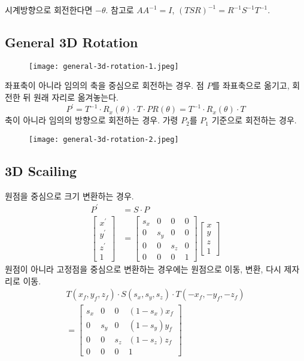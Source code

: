 시계방향으로 회전한다면 $-\theta$. 참고로 $AA^{-1} = I$, $(TSR)^{-1} = R^{-1}S^{-1}T^{-1}$.

\subsection{General 3D Rotation}

\begin{figure}[h]
  \centering
  \texttt{[image: general-3d-rotation-1.jpeg]}
\end{figure}
좌표축이 아니라 임의의 축을 중심으로 회전하는 경우. 점 $P$를 좌표축으로 옮기고, 회전한 뒤 원래 자리로 옮겨놓는다.
$$
P^\prime = T^{-1} \cdot R_x(\theta) \cdot T \cdot P
R(\theta) = T^{-1} \cdot R_x(\theta) \cdot T
$$
축이 아니라 임의의 방향으로 회전하는 경우. 가령 $P_2$를 $P_1$ 기준으로 회전하는 경우.
\begin{figure}[h]
  \centering
  \texttt{[image: general-3d-rotation-2.jpeg]}
\end{figure}

\subsection{3D Scailing}

원점을 중심으로 크기 변환하는 경우.
$$
\begin{aligned}
  P^\prime &= S \cdot P \\
  \begin{bmatrix}
    x^\prime \\
    y^\prime \\
    z^\prime \\
    1
  \end{bmatrix}
  &=
  \begin{bmatrix}
    s_x & 0 & 0 & 0 \\
    0 & s_y & 0 & 0 \\
    0 & 0 & s_z & 0 \\
    0 & 0 & 0 & 1
  \end{bmatrix}
  \begin{bmatrix}
    x \\
    y \\
    z \\
    1
  \end{bmatrix}
\end{aligned}
$$
원점이 아니라 고정점을 중심으로 변환하는 경우에는 원점으로 이동, 변환, 다시 제자리로 이동.
$$
\begin{aligned}
  T(x_f, y_f, z_f) \cdot S(s_x, s_y, s_z) \cdot T(-x_f, -y_f, -z_f) \\
  =
  \begin{bmatrix}
    s_x & 0 & 0 & (1 - s_x)x_f \\
    0 & s_y & 0 & (1 - s_y)y_f \\
    0 & 0 & s_z & (1 - s_z)z_f \\
    0 & 0 & 0 & 1
  \end{bmatrix}
\end{aligned}
$$


